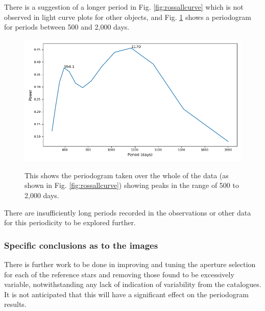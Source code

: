 {There is a suggestion of a longer period in Fig. \ref{fig:rossallcurve} which is
not observed in light curve plots for other objects, and Fig.
\ref{fig:rosslongperiod} shows a periodogram for periods between 500 and 2,000
days.

\begin{figure}[!htbp]
\begin{center}
\includegraphics[scale=0.40]{REM/images/rosslongperiod.png} \\
\vspace{-.5cm}
\end{center}   
\caption{This shows the periodogram taken
over the whole of the data (as shown in Fig.
\ref{fig:rossallcurve}) showing peaks in the
range of 500 to 2,000 days.}\protect\label{fig:rosslongperiod}
\end{figure}

There are insufficiently long periods recorded in the {\rem} observations or
other data for this periodicity to be explored further.}

\subsubsection{Specific conclusions as to the {\rem} images}
\protect\label{section:remconclusions}


There is further work to be done in improving and tuning the aperture selection
for each of the reference stars and removing those found to be excessively
variable, notwithstanding any lack of indication of variability from the
catalogues. It is not anticipated that this will have a significant effect on
the periodogram results.

